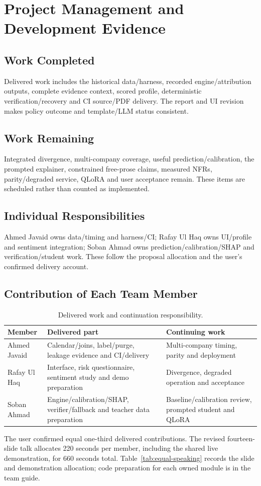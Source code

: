 \chapter{Project Management and Development Evidence}
\section{Work Completed}
Delivered work includes the historical data/harness, recorded engine/attribution outputs, complete evidence context, scored profile, deterministic verification/recovery and CI source/PDF delivery. The report and UI revision makes policy outcome and template/LLM status consistent.
\section{Work Remaining}
Integrated divergence, multi-company coverage, useful prediction/calibration, the prompted explainer, constrained free-prose claims, measured NFRs, parity/degraded service, QLoRA and user acceptance remain. These items are scheduled rather than counted as implemented.
\section{Individual Responsibilities}
Ahmed Javaid owns data/timing and harness/CI; Rafay Ul Haq owns UI/profile and sentiment integration; Soban Ahmad owns prediction/calibration/SHAP and verification/student work. These follow the proposal allocation and the user's confirmed delivery account.
\section{Contribution of Each Team Member}
\begin{longtable}{p{}p{}p{}}
\caption{Delivered work and continuation responsibility.}\label{tab:member-delivery}\\\toprule Member & Delivered part & Continuing work\\\midrule
Ahmed Javaid & Calendar/joins, label/purge, leakage evidence and CI/delivery & Multi-company timing, parity and deployment\\
Rafay Ul Haq & Interface, risk questionnaire, sentiment study and demo preparation & Divergence, degraded operation and acceptance\\
Soban Ahmad & Engine/calibration/SHAP, verifier/fallback and teacher data preparation & Baseline/calibration review, prompted student and QLoRA\\
\bottomrule\end{longtable}
The user confirmed equal one-third delivered contributions. The revised fourteen-slide talk allocates 220 seconds per member, including the shared live demonstration, for 660 seconds total. Table~\ref{tab:equal-speaking} records the slide and demonstration allocation; code preparation for each owned module is in the team guide.

